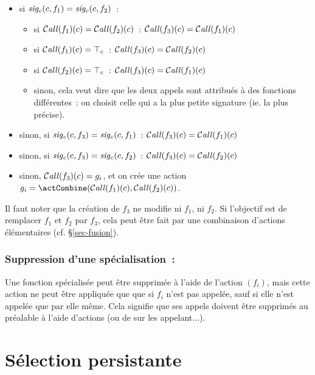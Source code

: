 \begin{itemize}
  \item si $\mathit{sig_c}(c, f_1)=\mathit{sig_c}(c, f_2)$~:
    \begin{itemize}
      \item si $\operatorname{\mathcal{C\mathit{all}}}(f_1)(c) = \operatorname{\mathcal{C\mathit{all}}}(f_2)(c)$~: $\operatorname{\mathcal{C\mathit{all}}}(f_3)(c) = \operatorname{\mathcal{C\mathit{all}}}(f_1)(c)$
      \item si $\operatorname{\mathcal{C\mathit{all}}}(f_1)(c) = {\top}_c$~: $\operatorname{\mathcal{C\mathit{all}}}(f_3)(c) = \operatorname{\mathcal{C\mathit{all}}}(f_2)(c)$
      \item si $\operatorname{\mathcal{C\mathit{all}}}(f_2)(c) = {\top}_c$~: $\operatorname{\mathcal{C\mathit{all}}}(f_3)(c) = \operatorname{\mathcal{C\mathit{all}}}(f_1)(c)$
      \item sinon, cela veut dire que les deux appels sont attribués à des
	fonctions différentes~: on choisit celle qui a la plus petite signature
	(ie. la plus précise).
    \end{itemize}
  \item sinon, si $\mathit{sig_c}(c, f_3)=\mathit{sig_c}(c, f_1)$~: $\operatorname{\mathcal{C\mathit{all}}}(f_3)(c) = \operatorname{\mathcal{C\mathit{all}}}(f_1)(c)$
  \item sinon, si $\mathit{sig_c}(c, f_3)=\mathit{sig_c}(c, f_2)$~: $\operatorname{\mathcal{C\mathit{all}}}(f_3)(c) = \operatorname{\mathcal{C\mathit{all}}}(f_2)(c)$
  \item sinon, $\operatorname{\mathcal{C\mathit{all}}}(f_3)(c) = g_i$, et on crée une action 
    $g_i = \actCombine(\Call(f_1)(c), \Call(f_2)(c))$.
\end{itemize}
\bb

Il faut noter que la création de $f_3$ ne modifie ni $f_1$, ni $f_2$.
Si l'objectif est de remplacer $f_1$ et $f_2$ par $f_3$,
cela peut être fait par une combinaison d'actions élémentaires
(cf. \S\ref{sec-fusion}).

\subsubsection{Suppression d'une spécialisation~: \actDeleteSlice}

Une fonction spécialisée peut être supprimée à l'aide de l'action
\actDeleteSlice$(f_i)$, mais cette action ne peut être appliquée que 
que si $f_i$ n'est pas appelée, sauf si elle n'est appelée que par elle même.
Cela signifie que ses appels doivent être supprimés au préalable à l'aide
d'actions \actChangeCall{} (ou de \actDeleteSlice{} sur les appelant...).


\section{Sélection persistante}

